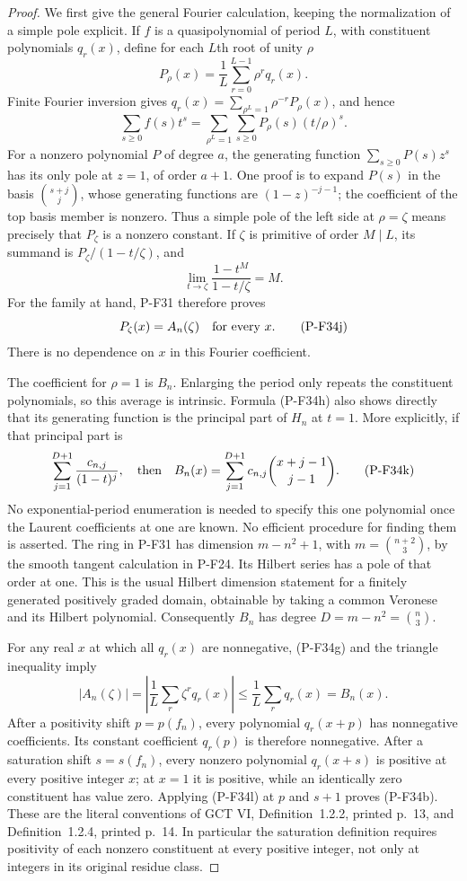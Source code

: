 \documentclass[11pt,a4paper]{article}
\begin{document}
\begin{proof}
We first give the general Fourier calculation, keeping the
normalization of a simple pole explicit. If $f$ is a
quasipolynomial of period $L$, with constituent polynomials
$q_r(x)$, define for each $L$th root of unity $\rho$
\[
 P_\rho(x)=\frac1L\sum_{r=0}^{L-1}\rho^r q_r(x).
 \tag{P-F34g}
\]
Finite Fourier inversion gives
$q_r(x)=\sum_{\rho^L=1}\rho^{-r}P_\rho(x)$, and hence
\[
 \sum_{s\ge0}f(s)t^s
   =\sum_{\rho^L=1}\sum_{s\ge0}P_\rho(s)(t/\rho)^s.
 \tag{P-F34h}
\]
For a nonzero polynomial $P$ of degree $a$, the generating
function $\sum_{s\ge0}P(s)z^s$ has its only pole at $z=1$,
of order $a+1$. One proof is to expand $P(s)$ in the
basis $\binom{s+j}{j}$, whose generating functions are
$(1-z)^{-j-1}$; the coefficient of the top basis member
is nonzero. Thus a simple pole of the left side at
$\rho=\zeta$ means precisely that $P_\zeta$ is a nonzero
constant. If $\zeta$ is primitive of order $M\mid L$,
its summand is $P_\zeta/(1-t/\zeta)$, and
\[
 \lim_{t\to\zeta}
       \frac{1-t^M}{1-t/\zeta}=M.
 \tag{P-F34i}
\]
For the family at hand, P-F31 therefore proves
\[
                   P_\zeta(x)=A_n(\zeta)
                         \quad\hbox{for every }x.
 \tag{P-F34j}
\]
There is no dependence on $x$ in this Fourier coefficient.

The coefficient for $\rho=1$ is $B_n$. Enlarging the
period only repeats the constituent polynomials, so this
average is intrinsic. Formula (P-F34h) also shows directly
that its generating function is the principal part of
$H_n$ at $t=1$. More explicitly, if that principal part is
\[
 \sum_{j=1}^{D+1}\frac{c_{n,j}}{(1-t)^j},
 \quad\hbox{then}\quad
 B_n(x)=\sum_{j=1}^{D+1}c_{n,j}
                        \binom{x+j-1}{j-1}.
 \tag{P-F34k}
\]
No exponential-period enumeration is needed to specify
this one polynomial once the Laurent coefficients at one
are known. No efficient procedure for finding them is
asserted.
The ring in P-F31 has dimension
$m-n^2+1$, with $m=\binom{n+2}{3}$, by the smooth tangent
calculation in P-F24. Its Hilbert series has a pole of
that order at one. This is the usual Hilbert dimension
statement for a finitely generated positively graded
domain, obtainable by taking a common Veronese and its
Hilbert polynomial. Consequently $B_n$ has degree
$D=m-n^2=\binom n3$.

For any real $x$ at which all $q_r(x)$ are nonnegative,
(P-F34g) and the triangle inequality imply
\[
 |A_n(\zeta)|
   =\left|\frac1L\sum_r\zeta^r q_r(x)\right|
   \le\frac1L\sum_r q_r(x)=B_n(x).
 \tag{P-F34l}
\]
After a positivity shift $p=p(f_n)$, every polynomial
$q_r(x+p)$ has nonnegative coefficients. Its constant
coefficient $q_r(p)$ is therefore nonnegative.
After a saturation shift $s=s(f_n)$, every nonzero
polynomial $q_r(x+s)$ is positive at every positive
integer $x$; at $x=1$ it is positive, while an identically
zero constituent has value zero. Applying (P-F34l) at
$p$ and $s+1$ proves (P-F34b).
These are the literal conventions of GCT VI,
Definition~1.2.2, printed p.~13, and Definition~1.2.4,
printed p.~14. In particular the saturation definition
requires positivity of each nonzero constituent at every
positive integer, not only at integers in its original
residue class.


\end{proof}
\end{document}
